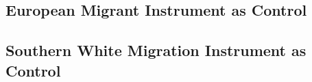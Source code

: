 \documentclass{article}
\begin{document}

\clearpage


\clearpage

\subsection{European Migrant Instrument as Control}



\clearpage




\clearpage



\clearpage

\subsection{Southern White Migration Instrument as Control}



\clearpage




\clearpage



\clearpage
\end{document}
